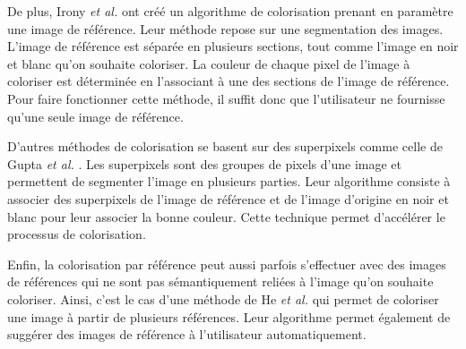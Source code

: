 \documentclass{article}
\begin{document}
De plus, Irony \emph{et al.} \cite{10.5555/2383654.2383683} ont créé un algorithme de colorisation prenant en paramètre une image de référence. Leur 
méthode repose sur une segmentation des images. L'image de référence est séparée en plusieurs sections, tout comme 
l'image en noir et blanc qu'on souhaite coloriser. La couleur de chaque pixel de l'image à coloriser est déterminée
en l'associant à une des sections de l'image de référence. Pour faire fonctionner cette méthode,
il suffit donc que l'utilisateur ne fournisse qu'une seule image de référence.

D'autres méthodes de colorisation se basent sur des superpixels comme celle de Gupta \emph{et al.} \cite{10.1145/2393347.2393402}. Les superpixels sont des groupes
de pixels d'une image et permettent de segmenter l'image en plusieurs parties. Leur algorithme consiste à associer des superpixels 
de l'image de référence et de l'image d'origine en noir et blanc pour leur associer la bonne couleur.
Cette technique permet d'accélérer le processus de colorisation.

Enfin, la colorisation par référence peut aussi parfois s'effectuer avec des images de références qui ne sont pas sémantiquement
reliées à l'image qu'on souhaite coloriser. Ainsi, c'est le cas d'une méthode de He \emph{et al.} \cite{journals/corr/abs-1807-06587} qui permet de coloriser une image à partir
de plusieurs références. Leur algorithme permet également de suggérer des images de référence à l'utilisateur automatiquement.




\end{document}
